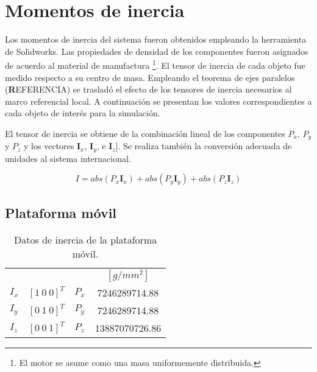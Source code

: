 \section{Momentos de inercia}

Los momentos de inercia del sistema fueron obtenidos
empleando la herramienta de Solidworks. 
Las propiedades de densidad de los componentes 
fueron asignados de acuerdo al material de manufactura
\footnote{El motor se asume como una masa uniformemente distribuida.}.
El tensor de inercia de cada objeto fue medido respecto a su centro de masa.
Empleando el teorema de ejes paralelos (\textbf REFERENCIA) se trasladó el efecto de los tensores de inercia necesarios al marco referencial local.
A continuación se presentan los valores correspondientes a cada objeto de interés para la simulación.

El tensor de inercia se obtiene de la combinación lineal 
de los componentes $P_x$, $P_y$ y $P_z$ y los vectores $\mathbf I_x$, $\mathbf I_y$, e $\mathbf I_z]$.
Se realiza también la conversión adecuada de unidades al
sistema internacional.

\begin{equation*}
 I = abs(P_x \mathbf I_x) + abs(P_y \mathbf I_y) +abs(P_z \mathbf I_z)
\end{equation*}

\subsection{Plataforma móvil}

% 

\begin{table}[hb!]
 \begin{center}
\begin{tabular}{lclc}
 & & & $[g/mm^2]$\\
 $ I_x $ & $ [1 \ 0 \ 0]^T $ & $ P_x $ & 7246289714.88\\
 $ I_y $ & $ [0 \ 1 \ 0]^T $ & $ P_y $ & 7246289714.88\\
 $ I_z $ & $ [0 \ 0 \ 1]^T $ & $ P_z $ & 13887070726.86
\end{tabular}
\end{center}
\caption{Datos de inercia de la plataforma móvil.}
\label{tab: inertia table platform}
\end{table}


